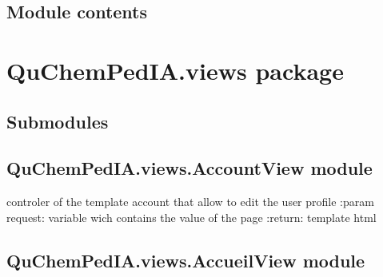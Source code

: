 \documentclass[letterpaper,10pt,english]{sphinxmanual}
\begin{document}
\subsection{Module contents}
\label{\detokenize{QuChemPedIA.models:module-QuChemPedIA.models}}\label{\detokenize{QuChemPedIA.models:module-contents}}

\section{QuChemPedIA.views package}
\label{\detokenize{QuChemPedIA.views:quchempedia-views-package}}\label{\detokenize{QuChemPedIA.views::doc}}

\subsection{Submodules}
\label{\detokenize{QuChemPedIA.views:submodules}}

\subsection{QuChemPedIA.views.AccountView module}
\label{\detokenize{QuChemPedIA.views:module-QuChemPedIA.views.AccountView}}\label{\detokenize{QuChemPedIA.views:quchempedia-views-accountview-module}}

\begin{fulllineitems}
\label{\detokenize{QuChemPedIA.views:QuChemPedIA.views.AccountView.account}}
controler of the template account that allow to edit the user profile
:param request: variable wich contains the value of the page
:return: template html

\end{fulllineitems}



\subsection{QuChemPedIA.views.AccueilView module}
\label{\detokenize{QuChemPedIA.views:module-QuChemPedIA.views.AccueilView}}\label{\detokenize{QuChemPedIA.views:quchempedia-views-accueilview-module}}
\end{document}
